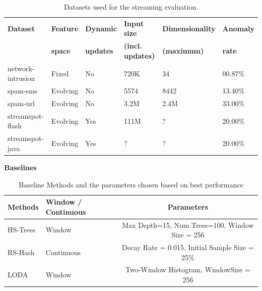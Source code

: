 \documentclass[11pt,onecolumn]{article}
\begin{document}
\begin{table}[ht!]
	\centering
	\begin{tabular}{llllll}
	\toprule
	\textbf{Dataset} & \textbf{Feature} & \textbf{Dynamic} & \textbf{Input size} 		  & \textbf{Dimensionality} & \textbf{Anomaly}\\
									 & \textbf{space}   & \textbf{updates} & \textbf{(incl. updates)} & \textbf{(maximum)} 			& \textbf{rate}\\
	\midrule
	network-intrusion& Fixed 	  		    & No				 & 720K    & 34   & 00.87\%\\
 	spam-sms 			 	 & Evolving 			  & No				 & 5574 	 & 8442 & 13.40\%\\
 	spam-url 			 	 & Evolving 				& No				 & 3.2M    & 2.4M & 33.00\%\\
	streamspot-flash & Evolving 				& Yes				 & 111M    & ?    & 20.00\%\\
	streamspot-java  & Evolving 				& Yes				 & ?       & ?    & 20.00\%\\
	\bottomrule
	\end{tabular}
	\caption{Datasets used for the streaming evaluation.}
	\label{table:datasets-streaming}
\end{table}

\textbf{Baselines}

\begin{table}
\centering
    \begin{tabular}{l|l|c}
    \toprule
    Methods  & Window / Continuous & Parameters                                           \\	\hline
    HS-Trees & Window              & Max Depth=15, Num Trees=100, Window Size = 256       \\
    RS-Hash  & Continuous          & Decay Rate =  0.015, Initial Sample Size = 25\% \\
    LODA     & Window              & Two-Window Histogram, WindowSize = 256               \\
    \bottomrule
    \end{tabular}
    \caption{Baseline Methods and the parameters chosen based on best performance}
\end{table}
\end{document}
